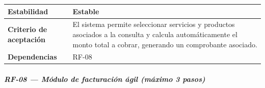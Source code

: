 {\def\LTcaptype{none} %
\begin{longtable}[]{@{}
  >{\raggedright\arraybackslash}p{}
  >{\raggedright\arraybackslash}p{}@{}}
\toprule\noalign{}
\begin{minipage}[b]{\linewidth}\raggedright
\textbf{Estabilidad}
\end{minipage} & \begin{minipage}[b]{\linewidth}\raggedright
Estable
\end{minipage} \\
\midrule\noalign{}
\endhead
\bottomrule\noalign{}
\endlastfoot
\textbf{Criterio de aceptación} &
\begin{minipage}[t]{\linewidth}\raggedright
El sistema permite seleccionar servicios y productos asociados a la
consulta y calcula automáticamente el monto total a cobrar, generando un
comprobante asociado.
\end{minipage} \\
\textbf{Dependencias} & \begin{minipage}[t]{\linewidth}\raggedright
RF-08
\end{minipage} \\
\end{longtable}
}

\subparagraph{RF-08 --- Módulo de facturación ágil (máximo 3
pasos)}\label{rf-08-muxf3dulo-de-facturaciuxf3n-uxe1gil-muxe1ximo-3-pasos}

